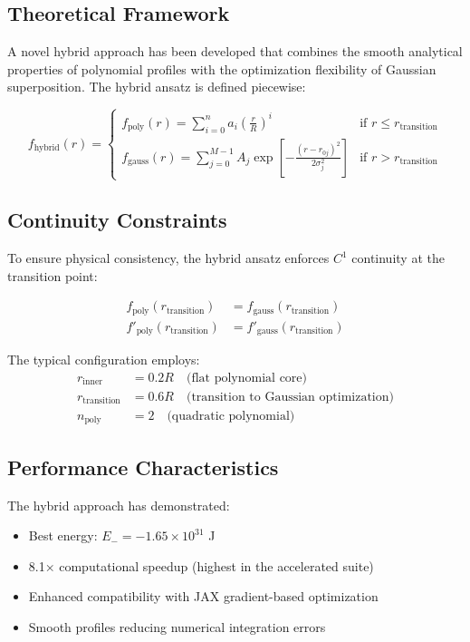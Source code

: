 \documentclass[12pt,a4paper]{article}
\begin{document}
\subsection{Theoretical Framework}

A novel hybrid approach has been developed that combines the smooth analytical properties of polynomial profiles with the optimization flexibility of Gaussian superposition. The hybrid ansatz is defined piecewise:

\begin{equation}
f_{\text{hybrid}}(r) = \begin{cases}
f_{\text{poly}}(r) = \sum_{i=0}^n a_i \left(\frac{r}{R}\right)^i & \text{if } r \leq r_{\text{transition}} \\
f_{\text{gauss}}(r) = \sum_{j=0}^{M-1} A_j \exp\left[-\frac{(r - r_{0j})^2}{2\sigma_j^2}\right] & \text{if } r > r_{\text{transition}}
\end{cases}
\end{equation}

\subsection{Continuity Constraints}

To ensure physical consistency, the hybrid ansatz enforces $C^1$ continuity at the transition point:

\begin{align}
f_{\text{poly}}(r_{\text{transition}}) &= f_{\text{gauss}}(r_{\text{transition}}) \\
f'_{\text{poly}}(r_{\text{transition}}) &= f'_{\text{gauss}}(r_{\text{transition}})
\end{align}

The typical configuration employs:
\begin{align}
r_{\text{inner}} &= 0.2R \quad \text{(flat polynomial core)} \\
r_{\text{transition}} &= 0.6R \quad \text{(transition to Gaussian optimization)} \\
n_{\text{poly}} &= 2 \quad \text{(quadratic polynomial)}
\end{align}

\subsection{Performance Characteristics}

The hybrid approach has demonstrated:
\begin{itemize}
\item Best energy: $E_- = -1.65 \times 10^{31}$ J
\item 8.1× computational speedup (highest in the accelerated suite)
\item Enhanced compatibility with JAX gradient-based optimization
\item Smooth profiles reducing numerical integration errors
\end{itemize}
\end{document}
